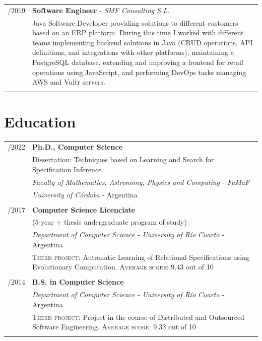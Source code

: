 \documentclass[a4paper,10pt]{article} %
\begin{document}
\begin{longtable}{>{\raggedleft\arraybackslash}p{} p{}}
2015/2019 & \textbf{Software Engineer} - \textit{SMF Consulting S.L}. \\ 
& Java Software Developer providing solutions to different customers based on an ERP platform. During this time I worked with different teams implementing backend solutions in Java (CRUD operations, API definitions, and integrations with other platforms), maintaining a PostgreSQL database, extending and improving a frontend for retail operations using JavaScript, and performing DevOps tasks managing AWS and Vultr servers. \\ & \\

\end{longtable}


\section{Education}

\begin{longtable}{>{\raggedleft\arraybackslash}p{} p{}}
\\
2017/2022 & \textbf{Ph.D., Computer Science} \\
& Dissertation: Techniques based on Learning and Search for Specification Inference. \\
& \textit{Faculty of Mathematics, Astronomy, Physics and Computing - FaMaF} \\ & \textit{University of Córdoba} - Argentina \\ & \\

2012/2017 & \textbf{Computer Science Licenciate} \\
& (5-year + thesis undergraduate program of study) \\
& \textit{Department of Computer Science - University of Río Cuarto} - Argentina \\ 
& \textsc{Thesis project:} Automatic Learning of Relational Specifications using Evolutionary Computation. \textsc{Average score:} 9.43 out of 10 \\ & \\

2012/2014	& \textbf{B.S. in Computer Science} \\
& \textit{Department of Computer Science - University of Río Cuarto} - Argentina \\
& \textsc{Thesis project:} Project in the course of Distributed and Outsourced Software Engineering. \textsc{Average score:} 9.33 out of 10 \\ \\ 

\end{longtable}
\end{document}
